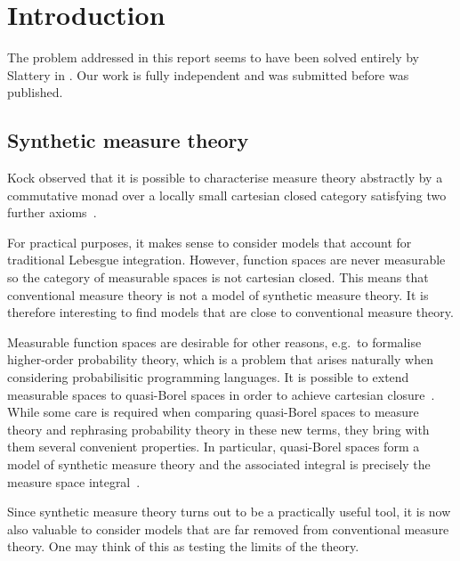 \chapter{Introduction}\label{sec:introduction}

The problem addressed in this report seems to have been solved entirely by
Slattery in \cite{slattery2023}. Our work is fully independent and was submitted before \cite{slattery2023} was published.

\section{Synthetic measure theory}

Kock observed that it is possible to characterise measure theory abstractly by a commutative monad
over a locally small cartesian closed category satisfying two further axioms~\cite{kock2011}.

For practical purposes, it makes sense to consider models that account for traditional Lebesgue integration.
However, function spaces are never measurable~\cite{aumann1961} so the category of measurable
spaces is not cartesian closed. This means that conventional measure theory is not a model of synthetic measure theory.
It is therefore interesting to find models that are close to conventional measure theory.

Measurable function spaces are desirable for other reasons, e.g.\ to formalise higher-order probability
theory, which is a problem that arises naturally when considering probabilisitic programming languages.
It is possible to extend measurable spaces to quasi-Borel spaces in order to achieve cartesian closure~\cite{heunen2017}. While some care is required when comparing quasi-Borel spaces to measure theory
and rephrasing probability theory in these new terms, they bring with them several convenient properties.
In particular, quasi-Borel spaces form a model of synthetic measure theory and the associated integral
is precisely the measure space integral~\cite{scibor2018}.

Since synthetic measure theory turns out to be a practically useful tool, it is now also
valuable to consider models that are far removed from conventional measure theory. One
may think of this as testing the limits of the theory.


